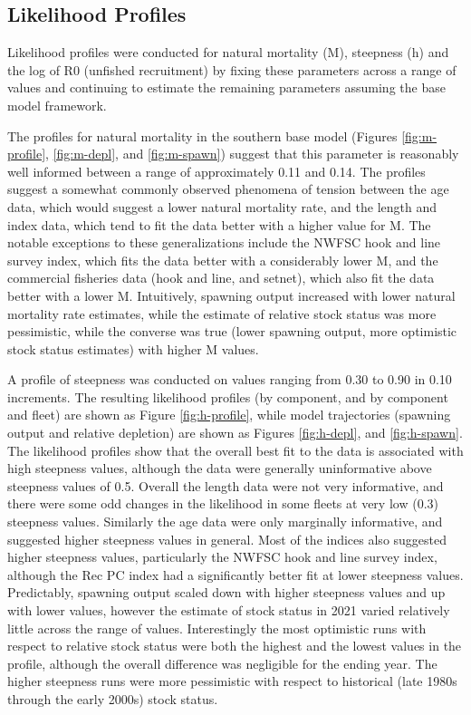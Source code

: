 \documentclass[
  english,
  a4paper,
]{article}
\begin{document}
\hypertarget{likelihood-profiles}{%
\subsection{Likelihood Profiles}\label{likelihood-profiles}}

Likelihood profiles were conducted for natural mortality (M), steepness (h) and the log of R0 (unfished recruitment) by fixing these parameters across a range of values and continuing to estimate the remaining parameters assuming the base model framework.

The profiles for natural mortality in the southern base model (Figures \ref{fig:m-profile}, \ref{fig:m-depl}, and \ref{fig:m-spawn}) suggest that this parameter is reasonably well informed between a range of approximately 0.11 and 0.14. The profiles suggest a somewhat commonly observed phenomena of tension between the age data, which would suggest a lower natural mortality rate, and the length and index data, which tend to fit the data better with a higher value for M. The notable exceptions to these generalizations include the NWFSC hook and line survey index, which fits the data better with a considerably lower M, and the commercial fisheries data (hook and line, and setnet), which also fit the data better with a lower M. Intuitively, spawning output increased with lower natural mortality rate estimates, while the estimate of relative stock status was more pessimistic, while the converse was true (lower spawning output, more optimistic stock status estimates) with higher M values.

A profile of steepness was conducted on values ranging from 0.30 to 0.90 in 0.10 increments. The resulting likelihood profiles (by component, and by component and fleet) are shown as Figure \ref{fig:h-profile}, while model trajectories (spawning output and relative depletion) are shown as Figures \ref{fig:h-depl}, and \ref{fig:h-spawn}. The likelihood profiles show that the overall best fit to the data is associated with high steepness values, although the data were generally uninformative above steepness values of 0.5. Overall the length data were not very informative, and there were some odd changes in the likelihood in some fleets at very low (0.3) steepness values. Similarly the age data were only marginally informative, and suggested higher steepness values in general. Most of the indices also suggested higher steepness values, particularly the NWFSC hook and line survey index, although the Rec PC index had a significantly better fit at lower steepness values. Predictably, spawning output scaled down with higher steepness values and up with lower values, however the estimate of stock status in 2021 varied relatively little across the range of values. Interestingly the most optimistic runs with respect to relative stock status were both the highest and the lowest values in the profile, although the overall difference was negligible for the ending year. The higher steepness runs were more pessimistic with respect to historical (late 1980s through the early 2000s) stock status.
\end{document}

